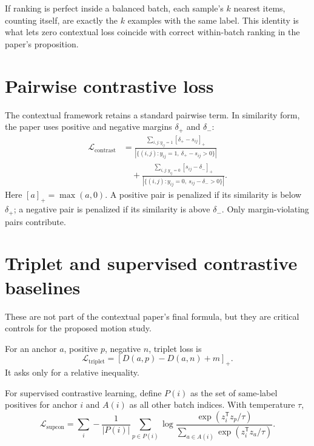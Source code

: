 \documentclass[11pt,oneside,openany]{book}
\theoremstyle{myplain}
\theoremstyle{definition}
\newcommand{\card}[1]{\left|#1\right|}
\newcommand{\transpose}{\mathsf{T}}
\newcommand{\paperEq}[1]{\tag{P#1}}
\begin{document}
\begin{conceptbox}[title=Why $k$ equals samples per class]
If ranking is perfect inside a balanced batch, each sample's $k$ nearest items, counting itself, are exactly the $k$ examples with the same label. This identity is what lets zero contextual loss coincide with correct within-batch ranking in the paper's proposition.
\end{conceptbox}

\section{Pairwise contrastive loss}

The contextual framework retains a standard pairwise term. In similarity form, the paper uses positive and negative margins $\delta_+$ and $\delta_-$:
\begin{equation*}
\begin{aligned}
\mathcal L_{\mathrm{contrast}}
&=
\frac{\sum_{i,j:y_{ij}=1}[\delta_+-s_{ij}]_+}
{\card{\{(i,j):y_{ij}=1,\ \delta_+-s_{ij}>0\}}}\\
&\quad+
\frac{\sum_{i,j:y_{ij}=0}[s_{ij}-\delta_-]_+}
{\card{\{(i,j):y_{ij}=0,\ s_{ij}-\delta_->0\}}}.
\end{aligned}
\paperEq{29}
\label{eq:contrastive}
\end{equation*}
Here $[a]_+=\max(a,0)$. A positive pair is penalized if its similarity is below $\delta_+$; a negative pair is penalized if its similarity is above $\delta_-$. Only margin-violating pairs contribute.

\section{Triplet and supervised contrastive baselines}

These are not part of the contextual paper's final formula, but they are critical controls for the proposed motion study.

For an anchor $a$, positive $p$, negative $n$, triplet loss is
\begin{equation}
  \mathcal L_{\mathrm{triplet}}=[D(a,p)-D(a,n)+m]_+.
  \label{eq:triplet}
\end{equation}
It asks only for a relative inequality.

For supervised contrastive learning, define $P(i)$ as the set of same-label positives for anchor $i$ and $A(i)$ as all other batch indices. With temperature $\tau$,
\begin{equation}
\mathcal L_{\mathrm{supcon}}
=\sum_i -\frac{1}{\card{P(i)}}\sum_{p\in P(i)}
\log\frac{\exp(z_i^\transpose z_p/\tau)}
{\sum_{a\in A(i)}\exp(z_i^\transpose z_a/\tau)}.
\label{eq:supcon}
\end{equation}
\end{document}
